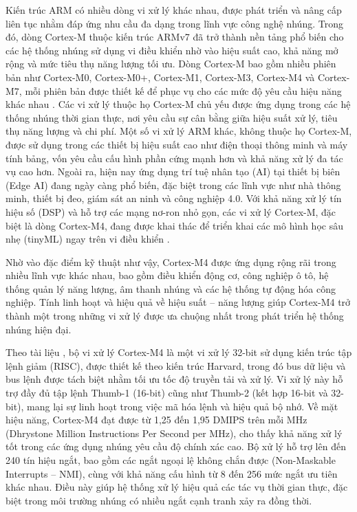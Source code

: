 Kiến trúc ARM có nhiều dòng vi xử lý khác nhau, được phát triển và nâng cấp liên tục nhằm đáp ứng nhu cầu đa dạng trong lĩnh vực công nghệ nhúng. Trong đó, dòng Cortex-M thuộc kiến trúc ARMv7 đã trở thành nền tảng phổ biến cho các hệ thống nhúng sử dụng vi điều khiển nhờ vào hiệu suất cao, khả năng mở rộng và mức tiêu thụ năng lượng tối ưu. Dòng Cortex-M bao gồm nhiều phiên bản như Cortex-M0, Cortex-M0+, Cortex-M1, Cortex-M3, Cortex-M4 và Cortex-M7, mỗi phiên bản được thiết kế để phục vụ cho các mức độ yêu cầu hiệu năng khác nhau \cite{arm_cortex_m_comparison}. Các vi xử lý thuộc họ Cortex-M chủ yếu được ứng dụng trong các hệ thống nhúng thời gian thực, nơi yêu cầu sự cân bằng giữa hiệu suất xử lý, tiêu thụ năng lượng và chi phí. Một số vi xử lý ARM khác, không thuộc họ Cortex-M, được sử dụng trong các thiết bị hiệu suất cao như điện thoại thông minh và máy tính bảng, vốn yêu cầu cấu hình phần cứng mạnh hơn và khả năng xử lý đa tác vụ cao hơn. Ngoài ra, hiện nay ứng dụng trí tuệ nhân tạo (AI) tại thiết bị biên (Edge AI) đang ngày càng phổ biến, đặc biệt trong các lĩnh vực như nhà thông minh, thiết bị đeo, giám sát an ninh và công nghiệp 4.0. Với khả năng xử lý tín hiệu số (DSP) và hỗ trợ các mạng nơ-ron nhỏ gọn, các vi xử lý Cortex-M, đặc biệt là dòng Cortex-M4, đang được khai thác để triển khai các mô hình học sâu nhẹ (tinyML) ngay trên vi điều khiển \cite{electronics11162545}\cite{applicationCortexM4}.

Nhờ vào đặc điểm kỹ thuật như vậy, Cortex-M4 được ứng dụng rộng rãi trong nhiều lĩnh vực khác nhau, bao gồm điều khiển động cơ, công nghiệp ô tô, hệ thống quản lý năng lượng, âm thanh nhúng và các hệ thống tự động hóa công nghiệp. Tính linh hoạt và hiệu quả về hiệu suất – năng lượng giúp Cortex-M4 trở thành một trong những vi xử lý được ưa chuộng nhất trong phát triển hệ thống nhúng hiện đại.

Theo tài liệu \cite{cortexM4}, bộ vi xử lý Cortex-M4 là một vi xử lý 32-bit sử dụng kiến trúc tập lệnh giảm (RISC), được thiết kế theo kiến trúc Harvard, trong đó bus dữ liệu và bus lệnh được tách biệt nhằm tối ưu tốc độ truyền tải và xử lý. Vi xử lý này hỗ trợ đầy đủ tập lệnh Thumb-1 (16-bit) cũng như Thumb-2 (kết hợp 16-bit và 32-bit), mang lại sự linh hoạt trong việc mã hóa lệnh và hiệu quả bộ nhớ. Về mặt hiệu năng, Cortex-M4 đạt được từ 1,25 đến 1,95 DMIPS trên mỗi MHz (Dhrystone Million Instructions Per Second per MHz), cho thấy khả năng xử lý tốt trong các ứng dụng nhúng yêu cầu độ chính xác cao. Bộ xử lý hỗ trợ lên đến 240 tín hiệu ngắt, bao gồm các ngắt ngoại lệ không chắn được (Non-Maskable Interrupts – NMI), cùng với khả năng cấu hình từ 8 đến 256 mức ngắt ưu tiên khác nhau. Điều này giúp hệ thống xử lý hiệu quả các tác vụ thời gian thực, đặc biệt trong môi trường nhúng có nhiều ngắt cạnh tranh xảy ra đồng thời.


